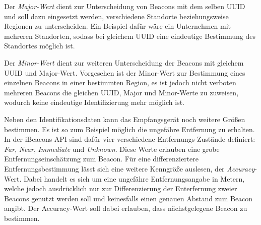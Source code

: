Der \emph{Major-Wert} dient zur Unterscheidung von Beacons mit dem selben UUID und soll dazu eingesetzt werden, verschiedene Standorte beziehungsweise Regionen zu unterscheiden. Ein Beispiel dafür wäre ein Unternehmen mit mehreren Standorten, sodass bei gleichem UUID eine eindeutige Bestimmung des Standortes möglich ist.

Der \emph{Minor-Wert} dient zur weiteren Unterscheidung der Beacons mit gleichem UUID und Major-Wert. Vorgesehen ist der Minor-Wert zur Bestimmung eines einzelnen Beacons in einer bestimmten Region, es ist jedoch nicht verboten mehreren Beacons die gleichen UUID, Major und Minor-Werte zu zuweisen, wodurch keine eindeutige Identifizierung mehr möglich ist. 

Neben den Identifikationsdaten kann das Empfangsgerät noch weitere Größen bestimmen. Es ist so zum Beispiel möglich die ungefähre Entfernung zu erhalten. 
In der iBeacons-API sind dafür vier verschiedene Entfernungs-Zustände definiert: \textit{Far}, \textit{Near}, \textit{Immediate} und \textit{Unknown}. Diese Werte erlauben eine grobe Entfernungseinschätzung zum Beacon. Für eine differenziertere Entfernungsbestimmung lässt sich eine weitere Kenngröße auslesen, der \textit{Accuracy}-Wert. Dabei handelt es sich um eine ungefähre Entfernungsangabe in Metern, welche jedoch ausdrücklich nur zur Differenzierung der Enterfernung zweier Beacons genutzt werden soll und keinesfalls einen genauen Abstand zum Beacon angibt. Der Accuracy-Wert soll dabei erlauben, dass nächstgelegene Beacon zu bestimmen.


